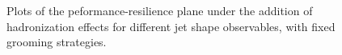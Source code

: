 \documentclass[11pt]{cernrep}
\begin{document}
\begin{figure}
  \caption{Plots of the peformance-resilience plane under the addition of hadronization effects for different jet shape observables, with fixed grooming strategies.}\label{jetsub_2prong_fig:shapes-hadronisation}
\end{figure}
\end{document}

